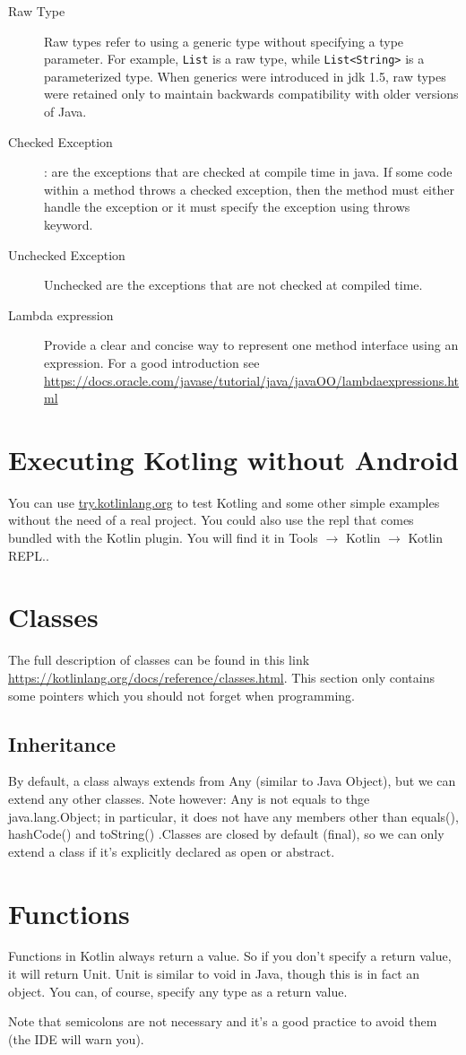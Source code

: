\begin{description}
	\item[Raw Type] Raw types refer to using a generic type without specifying a type parameter. For example, \texttt{List} is a raw type, while \texttt{List<String>} is a parameterized type. When generics were introduced in \gls{jdk} 1.5, raw types were retained only to maintain backwards compatibility with older versions of Java.
	\item[Checked Exception]: are the exceptions that are checked at compile time in java. If some code within a method throws a checked exception, then the method must either handle the exception or it must specify the exception using throws keyword.
	\item[Unchecked Exception] Unchecked are the exceptions that are not checked at compiled time.
	\item[Lambda expression] Provide a clear and concise way to represent one method interface using an expression. For a good introduction see \url{https://docs.oracle.com/javase/tutorial/java/javaOO/lambdaexpressions.html}
\end{description}

\section{Executing Kotling without Android}

You can use \url{try.kotlinlang.org} to test Kotling and some other simple examples without the need of
a real project. You could also use the \gls{repl} that comes bundled with the Kotlin plugin. You will
find it in Tools $\rightarrow$ Kotlin $\rightarrow$ Kotlin REPL..

\section{Classes}
The full description of classes can be found in this link \url{https://kotlinlang.org/docs/reference/classes.html}. This section only contains some pointers which you should not forget when programming. 

\subsection{Inheritance}
By default, a class always extends from Any (similar to Java Object), but we can
extend any other classes. Note however: Any is not  equals to thge java.lang.Object; in particular, it does not have any members other than equals(), hashCode() and toString() .Classes are closed by default (final), so we can only extend
a class if it’s explicitly declared as open or abstract.

\section{Functions}
Functions in Kotlin always return a value. So if you don’t specify a return value, it will return Unit.
Unit is similar to void in Java, though this is in fact an object. You can, of course,
specify any type as a return value.

Note that semicolons are not  necessary
and it’s a good practice to avoid them (the IDE will warn you).


